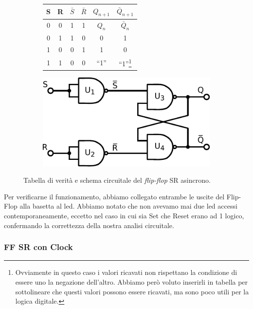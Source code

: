 \begin{savenotes}
\begin{figure}[htpc]
\centering
	\begin{subfigure}[hc]{.4\textwidth}
		\centering
		{\renewcommand{\arraystretch}{1.1}%
		\begin{tabular}{|c|c|c|c|c|c|}
		\hline
		S & R & $\bar S$ & $\bar R$ & $Q_{n+1}$ & $\bar Q_{n+1}$ \\
		\hline \hline
		0 & 0 & 1 & 1 & $Q_n$ & $\bar Q_n$\\
		\hline
		0 & 1 & 1 & 0 &  0  &  1\\
		\hline
		1 & 0 & 0 & 1 &  1  &  0\\
		\hline
		1 & 1 & 0 & 0 & ``1'' & ``1''\footnote{Ovviamente in questo caso i valori ricavati non rispettano la condizione di essere uno la negazione dell'altro.
Abbiamo però voluto inserirli in tabella per sottolineare che questi valori possono essere ricavati, ma sono poco utili per la logica digitale.}\\
		\hline
		\end{tabular}}
		\label{tab11:FFSR}
        \end{subfigure}
        \begin{subfigure}[hc]{.4\textwidth}
		\centering
		\includegraphics[width=.7\textwidth]{../E11/latex/FF-SR-async.pdf}
		\caption{}
		\label{cir11:FF-SR-a}
        \end{subfigure}
\caption{Tabella di verità e schema circuitale del \textit{flip-flop} SR asincrono.}
\end{figure}
\end{savenotes}

Per verificarne il funzionamento, abbiamo collegato entrambe le uscite del Flip-Flop alla basetta al led.
Abbiamo notato che non avevamo mai due led accessi contemporaneamente, eccetto nel caso in cui sia Set che Reset erano ad 1 logico, confermando la correttezza della nostra analisi circuitale.

\subsubsection*{FF SR con Clock}

